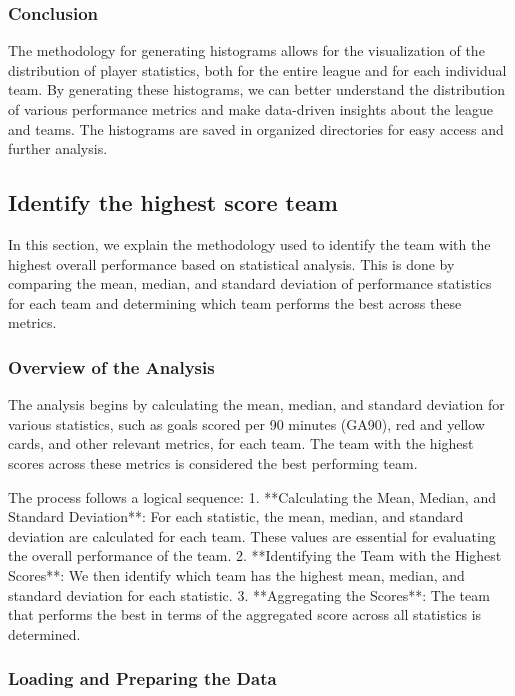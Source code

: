 \documentclass[a4paper,12pt]{article}
\begin{document}
\subsubsection{Conclusion}

The methodology for generating histograms allows for the visualization of the distribution of player statistics, both for the entire league and for each individual team. By generating these histograms, we can better understand the distribution of various performance metrics and make data-driven insights about the league and teams. The histograms are saved in organized directories for easy access and further analysis.

\subsection{Identify the highest score team}
In this section, we explain the methodology used to identify the team with the highest overall performance based on statistical analysis. This is done by comparing the mean, median, and standard deviation of performance statistics for each team and determining which team performs the best across these metrics.

\subsubsection{Overview of the Analysis}

The analysis begins by calculating the mean, median, and standard deviation for various statistics, such as goals scored per 90 minutes (GA90), red and yellow cards, and other relevant metrics, for each team. The team with the highest scores across these metrics is considered the best performing team.

The process follows a logical sequence:
1. **Calculating the Mean, Median, and Standard Deviation**: For each statistic, the mean, median, and standard deviation are calculated for each team. These values are essential for evaluating the overall performance of the team.
2. **Identifying the Team with the Highest Scores**: We then identify which team has the highest mean, median, and standard deviation for each statistic.
3. **Aggregating the Scores**: The team that performs the best in terms of the aggregated score across all statistics is determined.

\subsubsection{Loading and Preparing the Data}
\end{document}

